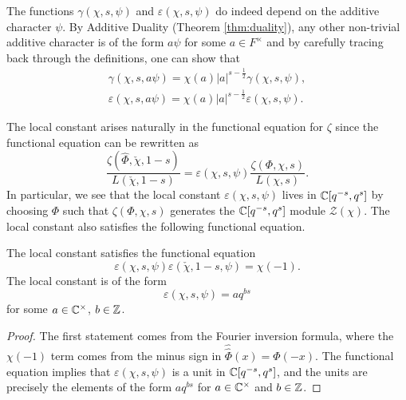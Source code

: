 \begin{rem}
    The functions $\gamma(\chi,s,\psi)$ and $\varepsilon(\chi,s,\psi)$ do indeed depend on the additive character $\psi$. By Additive Duality (Theorem \ref{thm:duality}), any other non-trivial additive character is of the form $a\psi$ for some $a\in F^\times$ and by carefully tracing back through the definitions, one can show that 
    \begin{align*}
        \gamma(\chi,s,a\psi)=\chi(a)|a|^{s-\frac{1}{2}}\gamma(\chi,s,\psi),\\
        \varepsilon(\chi,s,a\psi)=\chi(a)|a|^{s-\frac{1}{2}}\varepsilon(\chi,s,\psi).
    \end{align*}
\end{rem}

The local constant arises naturally in the functional equation for $\zeta$ since the functional equation can be rewritten as
$$\frac{\zeta(\hat{\Phi},\check{\chi},1-s)}{L(\check{\chi},1-s)} = \varepsilon(\chi,s,\psi) \frac{\zeta(\Phi,\chi,s)}{L(\chi,s)}.$$
In particular, we see that the local constant $\varepsilon(\chi,s,\psi)$ lives in $\mathbb{C}[q^{-s},q^s]$ by choosing $\Phi$ such that $\zeta(\Phi,\chi,s)$ generates the $\mathbb{C}[q^{-s},q^s]$ module $\mathcal Z(\chi)$. The local constant also satisfies the following functional equation.

\begin{cor}
    The local constant satisfies the functional equation
    $$\varepsilon(\chi,s,\psi)\varepsilon(\check{\chi},1-s,\psi) = \chi(-1).$$
    The local constant is of the form $$\varepsilon(\chi,s,\psi) = aq^{bs}$$ for some $a \in \mathbb{C}^\times$, $b \in \mathbb{Z}$.
\end{cor}
\begin{proof}
    The first statement comes from the Fourier inversion formula, where the $\chi(-1)$ term comes from the minus sign in $\hat{\hat{\Phi}}(x) = \Phi(-x)$. The functional equation implies that $\varepsilon(\chi,s,\psi)$ is a unit in $\mathbb{C}[q^{-s},q^s]$, and the units are precisely the elements of the form $aq^{bs}$ for $a\in\mathbb{C}^\times$ and $b \in \mathbb{Z}$.
\end{proof}

